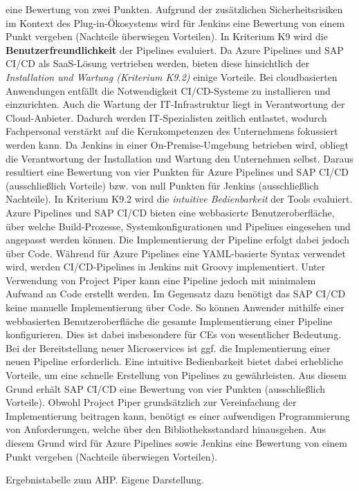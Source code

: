 eine Bewertung von zwei Punkten. Aufgrund der zusätzlichen Sicherheitsrisiken im Kontext des Plug-in-Ökosystems wird für Jenkins eine Bewertung von einem Punkt vergeben (Nachteile überwiegen Vorteilen). In Kriterium K9 wird die \textbf{Benutzerfreundlichkeit} der Pipelines evaluiert. Da Azure Pipelines und SAP CI/CD als SaaS-Lösung vertrieben werden, bieten diese hinsichtlich der \textit{Installation und Wartung (Kriterium K9.2)} einige Vorteile. Bei cloudbasierten Anwendungen entfällt die Notwendigkeit CI/CD-Systeme zu installieren und einzurichten. Auch die Wartung der IT-Infrastruktur liegt in Verantwortung der Cloud-Anbieter. Dadurch werden IT-Spezialisten zeitlich entlastet, wodurch Fachpersonal verstärkt auf die Kernkompetenzen des Unternehmens fokussiert werden kann. Da Jenkins in einer On-Premise-Umgebung betrieben wird, obliegt die Verantwortung der Installation und Wartung den Unternehmen selbst. Daraus resultiert eine Bewertung von vier Punkten für Azure Pipelines und SAP CI/CD (ausschließlich Vorteile) bzw. von null Punkten für Jenkins (ausschließlich Nachteile). In Kriterium K9.2 wird die \textit{intuitive Bedienbarkeit} der Tools evaluiert. Azure Pipelines und SAP CI/CD bieten eine webbasierte Benutzeroberfläche, über welche Build-Prozesse, Systemkonfigurationen und Pipelines eingesehen und angepasst werden können. Die Implementierung der Pipeline erfolgt dabei jedoch über Code. Während für Azure Pipelines eine YAML-basierte Syntax verwendet wird, werden CI/CD-Pipelines in Jenkins mit Groovy implementiert. Unter Verwendung von Project Piper kann eine Pipeline jedoch mit minimalem Aufwand an Code erstellt werden. Im Gegensatz dazu benötigt das SAP CI/CD keine manuelle Implementierung über Code. So können Anwender mithilfe einer webbasierten Benutzeroberfläche die gesamte Implementierung einer Pipeline konfigurieren. Dies ist dabei insbesondere für CEs von wesentlicher Bedeutung. Bei der Bereitstellung neuer Microservices ist ggf. die Implementierung einer neuen Pipeline erforderlich. Eine intuitive Bedienbarkeit bietet dabei erhebliche Vorteile, um eine schnelle Erstellung von Pipelines zu gewährleisten. Aus diesem Grund erhält SAP CI/CD eine Bewertung von vier Punkten (ausschließlich Vorteile). Obwohl Project Piper grundsätzlich zur Vereinfachung der Implementierung beitragen kann, benötigt es einer aufwendigen Programmierung von Anforderungen, welche über den Bibliotheksstandard hinausgehen. Aus diesem Grund wird für Azure Pipelines sowie Jenkins eine Bewertung von einem Punkt vergeben (Nachteile überwiegen Vorteilen).
\begin{center}
	\begin{table}[H]
		\centering
		\caption[Ergebnistabelle zum AHP]{Ergebnistabelle zum AHP. Eigene Darstellung.}
		\label{tab:Ergebnis}
	\end{table}
\end{center}
